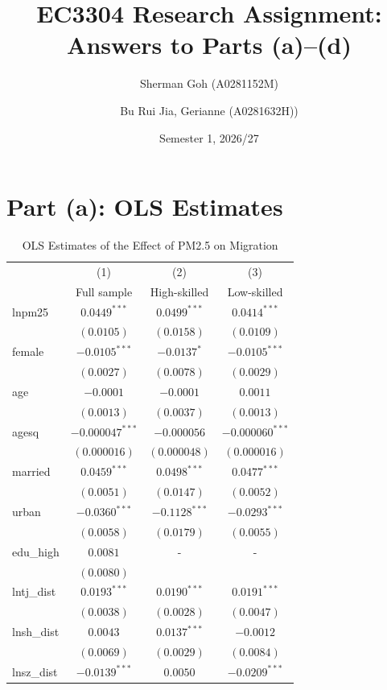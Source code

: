 \documentclass[11pt]{article}
\title{EC3304 Research Assignment: Answers to Parts (a)--(d)}
\author{Sherman Goh (A0281152M) \and Bu Rui Jia, Gerianne (A0281632H))}
\date{Semester 1, 2026/27}
\begin{document}
\maketitle

\section*{Part (a): OLS Estimates}

\begin{table}[H]
\centering
\begin{threeparttable}
\caption{OLS Estimates of the Effect of PM2.5 on Migration}
\label{tab:ols}
\small
\begin{tabular}{lccc}
\toprule
 & (1) & (2) & (3) \\
 & Full sample & High-skilled & Low-skilled \\
\midrule
lnpm25 & $0.0449^{***}$ & $0.0499^{***}$ & $0.0414^{***}$ \\
 & $(0.0105)$ & $(0.0158)$ & $(0.0109)$ \\
female & $-0.0105^{***}$ & $-0.0137^{*}$ & $-0.0105^{***}$ \\
 & $(0.0027)$ & $(0.0078)$ & $(0.0029)$ \\
age & $-0.0001$ & $-0.0001$ & $0.0011$ \\
 & $(0.0013)$ & $(0.0037)$ & $(0.0013)$ \\
agesq & $-0.000047^{***}$ & $-0.000056$ & $-0.000060^{***}$ \\
 & $(0.000016)$ & $(0.000048)$ & $(0.000016)$ \\
married & $0.0459^{***}$ & $0.0498^{***}$ & $0.0477^{***}$ \\
 & $(0.0051)$ & $(0.0147)$ & $(0.0052)$ \\
urban & $-0.0360^{***}$ & $-0.1128^{***}$ & $-0.0293^{***}$ \\
 & $(0.0058)$ & $(0.0179)$ & $(0.0055)$ \\
edu\_high & $0.0081$ & -  & - \\
 & $(0.0080)$ &  &  \\
lntj\_dist & $0.0193^{***}$ & $0.0190^{***}$ & $0.0191^{***}$ \\
 & $(0.0038)$ & $(0.0028)$ & $(0.0047)$ \\
lnsh\_dist & $0.0043$ & $0.0137^{***}$ & $-0.0012$ \\
 & $(0.0069)$ & $(0.0029)$ & $(0.0084)$ \\
lnsz\_dist & $-0.0139^{***}$ & $0.0050$ & $-0.0209^{***}$ \\

\end{tabular}
\end{threeparttable}
\end{table}
\end{document}
